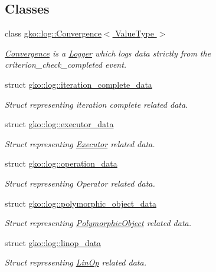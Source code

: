 \subsection*{Classes}
\begin{DoxyCompactItemize}
\item 
class \hyperlink{classgko_1_1log_1_1Convergence}{gko\+::log\+::\+Convergence$<$ Value\+Type $>$}
\begin{DoxyCompactList}\small\item\em \hyperlink{classgko_1_1log_1_1Convergence}{Convergence} is a \hyperlink{classgko_1_1log_1_1Logger}{Logger} which logs data strictly from the {\ttfamily criterion\+\_\+check\+\_\+completed} event. \end{DoxyCompactList}\item 
struct \hyperlink{structgko_1_1log_1_1iteration__complete__data}{gko\+::log\+::iteration\+\_\+complete\+\_\+data}
\begin{DoxyCompactList}\small\item\em Struct representing iteration complete related data. \end{DoxyCompactList}\item 
struct \hyperlink{structgko_1_1log_1_1executor__data}{gko\+::log\+::executor\+\_\+data}
\begin{DoxyCompactList}\small\item\em Struct representing \hyperlink{classgko_1_1Executor}{Executor} related data. \end{DoxyCompactList}\item 
struct \hyperlink{structgko_1_1log_1_1operation__data}{gko\+::log\+::operation\+\_\+data}
\begin{DoxyCompactList}\small\item\em Struct representing Operator related data. \end{DoxyCompactList}\item 
struct \hyperlink{structgko_1_1log_1_1polymorphic__object__data}{gko\+::log\+::polymorphic\+\_\+object\+\_\+data}
\begin{DoxyCompactList}\small\item\em Struct representing \hyperlink{classgko_1_1PolymorphicObject}{Polymorphic\+Object} related data. \end{DoxyCompactList}\item 
struct \hyperlink{structgko_1_1log_1_1linop__data}{gko\+::log\+::linop\+\_\+data}
\begin{DoxyCompactList}\small\item\em Struct representing \hyperlink{classgko_1_1LinOp}{Lin\+Op} related data. \end{DoxyCompactList}\item 

\end{DoxyCompactItemize}
